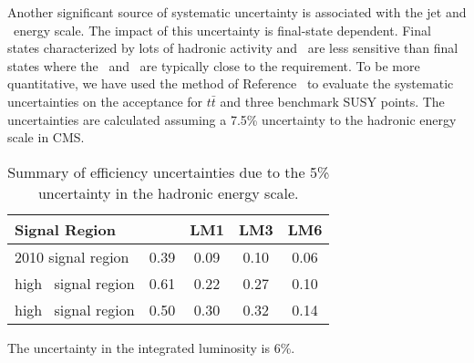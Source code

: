 Another significant source of systematic uncertainty is 
associated with the jet and \met\ energy scale.  The impact
of this uncertainty is final-state dependent.  Final
states characterized by lots of hadronic activity and \met\ are 
less sensitive than final states where the \met\ and \Ht\
are typically close to the requirement.  To be more quantitative,
we have used the method of Reference~\cite{ref:top} to evaluate
the systematic uncertainties on the acceptance for $t\bar{t}$ 
and three benchmark SUSY points.  The uncertainties are calculated
assuming a 7.5\% uncertainty to the hadronic energy scale in CMS.

\begin{table}[hbt]
\begin{center}
\caption{\label{tab:jetmet} 
Summary of efficiency uncertainties due to the 5\% uncertainty in the hadronic energy scale.
}
\vspace{.25cm}
\begin{tabular}{l|cccc}
\hline
Signal Region             & \ttbar  &   LM1   &   LM3  &  LM6  \\
\hline
2010 signal region        &  0.39   &  0.09   &  0.10  &  0.06 \\
high \met\ signal region  &  0.61   &  0.22   &  0.27  &  0.10 \\ 
high \Ht\ signal region   &  0.50   &  0.30   &  0.32  &  0.14 \\
\hline
\end{tabular}
\end{center}
\end{table}

The uncertainty in the integrated luminosity is 6\%.
